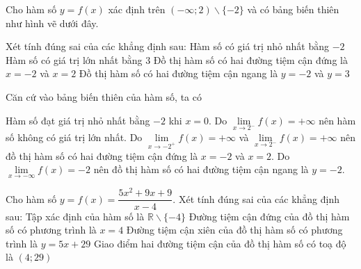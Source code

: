 \begin{ex}%
    Cho hàm số $y=f(x)$ xác định trên $(-\infty;2) \backslash\{-2\}$ và có bảng biến thiên như hình vẽ dưới đây.
    \begin{center}
    \end{center}
    Xét tính đúng sai của các khẳng định sau:
    \choiceTF
    {\True Hàm số có giá trị nhỏ nhất bằng $-2$}
    {Hàm số có giá trị lớn nhất bằng $3$}
    {\True Đồ thị hàm số có hai đường tiệm cận đứng là $x=-2$ và $x=2$}
    {Đồ thị hàm số có hai đường tiệm cận ngang là $y=-2$ và $y=3$}
    \loigiai
    {
        Căn cứ vào bảng biến thiên của hàm số, ta có
        \begin{itemchoice}
            \itemch Hàm số đạt giá trị nhỏ nhất bằng $-2$ khi $x=0$.
            \itemch Do $\lim\limits_{x\to 2^{-}}f(x)=+\infty$ nên hàm số không có giá trị lớn nhất.
            \itemch Do $\lim\limits_{x\to -2^{+}}f(x)=+\infty$ và $\lim\limits_{x\to 2^{-}}f(x)=+\infty$ nên đồ thị hàm số có hai đường tiệm cận đứng là $x=-2$ và $x=2$.
            \itemch Do $\lim\limits_{x\to -\infty}f(x)=-2$ nên đồ thị hàm số có hai đường tiệm cận ngang là $y=-2$.
    \end{itemchoice}}
\end{ex}

\begin{ex}
    Cho hàm số $y=f(x)=\dfrac{5 x^2+9 x+9}{x-4}$. Xét tính đúng sai của các khẳng định sau:
    \choiceTF
    {Tập xác định của hàm số là $\mathbb{R}\backslash\{-4\}$}
    {\True Đường tiệm cận đứng của đồ thị hàm số có phương trình là $x=4$}
    {\True Đường tiệm cận xiên của đồ thị hàm số có phương trình là $y=5x+29$}
    {Giao điểm hai đường tiệm cận của đồ thị hàm số có toạ độ là $(4;29)$}
\end{ex}

